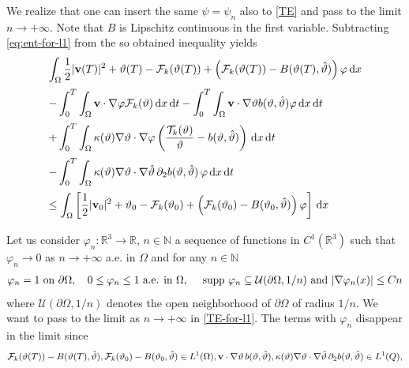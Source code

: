 \documentclass[11pt, a4paper, reqno]{amsart}
\newcommand{\N}{\mathbb N}
\newcommand{\R}{{\mathbb R}}
\numberwithin{equation}{section}
\newcommand{\thetah}{\hat\thet}
\newcommand{\vc}[1]{{\bf #1}}
\newcommand{\vv}{\vc{v}}
\newcommand{\thet}{\vartheta}
\renewcommand{\S}{\mathbf{S}}
\newcommand{\D}{\mathbf{D}}
\newcommand{\dt}{\,{\rm d} t }
\newcommand{\dx}{\,{\rm d} {x}}
\newcommand{\dxdt}{\dx  \dt}
\newcommand{\intO}[1]{\int_{\Omega} #1 \dx}
\newcommand{\intTO}[1]{\int_0^T \int_{\Omega} #1  \dxdt}
\newcommand{\bb}{b}
\newcommand{\B}{B}
\newcommand{\cF}{\mathcal{F}}
\begin{document}
We realize that one can insert the same $\psi=\psi_n$ also to \eqref{TE} and pass to the limit $n\to+\infty$. Note that $B$ is Lipschitz continuous in the first variable.  Subtracting \eqref{eq:ent-for-l1} from the so obtained inequality yields
\begin{equation}\label{TE-for-l1}
\begin{array}{l}\displaystyle\vspace{6pt}
  \intO{\frac12{|\vv(T)|^2} + \thet(T) -\cF_k(\thet(T))+\left(\cF_k(\thet(T))- \B(\thet(T), \thetah)\right)\varphi}\\ \displaystyle\vspace{6pt}
  -  \intTO{\vv\cdot\nabla \varphi\cF_k(\thet)}-\intTO{\vv\cdot\nabla \thet\bb(\thet, \thetah)\varphi}
  \\ \displaystyle\vspace{6pt}
  + \intTO{\kappa(\thet)\nabla\thet\cdot \nabla \varphi \left(\frac{\mathcal{T}_k(\thet)}\thet -\bb(\thet, \thetah)\right)}
  \\ \displaystyle\vspace{6pt}
  -\intTO{\kappa(\thet)\nabla\thet\cdot\nabla\thetah \,\partial_{2} \bb(\thet, \thetah)\,\varphi}\\\displaystyle\vspace{6pt}
  \leq
  \intO{\left[\frac12{|\vv_0|^2} + \thet_0 -\cF_k(\thet_0)+\left(\cF_k(\thet_0)- \B(\thet_0, \thetah)\right)\varphi\right]}
\end{array}
\end{equation}
Let us consider $\varphi_n:\R^3\to\R$, $n\in\N$ a sequence of functions in $C^1(\R^3)$ such that
$\varphi_n\to 0$ as $n\to+\infty$ a.e. in $\Omega$ and for any $n\in\N$
\begin{equation*}\begin{split}
\varphi_n=1\mbox{ on }\partial\Omega,\quad 0\leq\varphi_n\leq1 \mbox{ a.e. in } \Omega,\quad \ {\rm supp }\ \varphi_n \subseteq \mathcal{U}(\partial\Omega, {1}/{n}) \mbox{ and } |\nabla \varphi_n(x)|\leq Cn
\end{split}\end{equation*}
where $\mathcal{U}(\partial\Omega, {1}/{n})$ denotes the open neighborhood of $\partial\Omega$ of radius ${1}/{n}$.
We want to pass to the limit as $n\to+\infty$ in \eqref{TE-for-l1}. The terms with $\varphi_n$ disappear in the limit since
$$
\cF_k(\thet(T))- \B(\thet(T), \thetah),\cF_k(\thet_0)- \B(\thet_0, \thetah)\in L^1(\Omega), \vv\cdot\nabla \thet \, b(\thet, \thetah), \kappa(\thet)\nabla\thet\cdot\nabla\thetah \,\partial_{2} \bb(\thet, \thetah)\in L^1(Q),
$$
\end{document}
